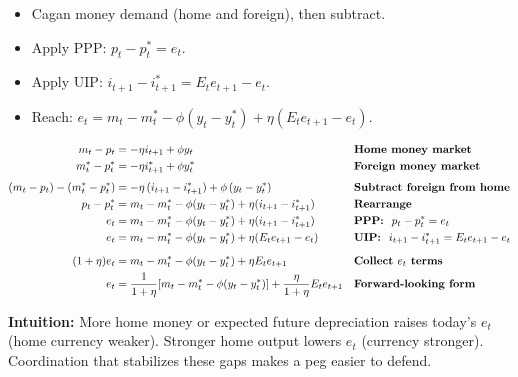 \documentclass[12pt]{article}
\begin{document}
\begin{itemize}
    \item Cagan money demand (home and foreign), then subtract.
    \item Apply PPP: $p_t-p_t^* = e_t$.
    \item Apply UIP: $i_{t+1}-i_{t+1}^* = E_t e_{t+1}-e_t$.
    \item Reach: $e_t = m_t-m_t^*-\phi(y_t-y_t^*)+\eta(E_t e_{t+1}-e_t)$.
\end{itemize}

\singlespacing
\begin{align}
m_t - p_t &= -\eta i_{t+1} + \phi y_t && \text{\textbf{Home money market}}\\
m_t^* - p_t^* &= -\eta i_{t+1}^* + \phi y_t^* && \text{\textbf{Foreign money market}}\\[4pt]
(m_t-p_t) - (m_t^*-p_t^*) &= -\eta\,(i_{t+1}-i_{t+1}^*) + \phi\,(y_t-y_t^*) && \text{\textbf{Subtract foreign from home}}\\
p_t - p_t^* &= m_t - m_t^* - \phi (y_t - y_t^*) + \eta (i_{t+1}-i_{t+1}^*) && \text{\textbf{Rearrange}}\\
e_t &= m_t - m_t^* - \phi (y_t - y_t^*) + \eta (i_{t+1}-i_{t+1}^*) && \text{\textbf{PPP: } $p_t-p_t^*=e_t$}\\
e_t &= m_t - m_t^* - \phi (y_t - y_t^*) + \eta (E_t e_{t+1}-e_t) && \text{\textbf{UIP: } $i_{t+1}-i_{t+1}^*=E_t e_{t+1}-e_t$}\\[6pt]
(1+\eta)e_t &= m_t - m_t^* - \phi (y_t - y_t^*) + \eta E_t e_{t+1} && \text{\textbf{Collect $e_t$ terms}}\\
e_t &= \frac{1}{1+\eta}\!\left[m_t - m_t^* - \phi (y_t - y_t^*)\right] + \frac{\eta}{1+\eta} E_t e_{t+1} && \text{\textbf{Forward-looking form}}
\end{align}

\textbf{Intuition:} More home money or expected future depreciation raises today’s $e_t$ (home currency weaker). Stronger home output lowers $e_t$ (currency stronger). Coordination that stabilizes these gaps makes a peg easier to defend.
\end{document}
